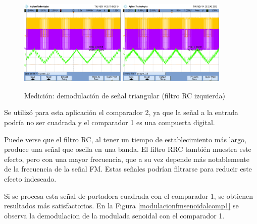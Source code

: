 \begin{figure}[H]
    \centering
    \includegraphics[width=0.45\textwidth]{../Ex2/resources/demodulacionfmtrirc.png}
    \includegraphics[width=0.45\textwidth]{../Ex2/resources/demodulacionfmtrirrc.png}
    \caption{Medición: demodulación de señal triangular (filtro RC izquierda)}
    \label{demodulacionfmtri}
\end{figure}
Se utilizó para esta aplicación el comparador 2, ya que la señal a la entrada podría no ser cuadrada y el comparador 1 es una compuerta digital.

Puede verse que el filtro RC, al tener un tiempo de establecimiento más largo, produce una señal que oscila en una banda. El filtro RRC también muestra este efecto, pero con una mayor frecuencia, que a su vez depende más notablemente de la frecuencia de la señal FM. Estas señales podrían filtrarse para reducir este efecto indeseado.

Si se procesa esta señal de portadora cuadrada con el comparador 1, se obtienen resultados más satisfactorios. En la Figura \ref{modulacionfmsenoidalcomp1} se observa la demodulacion de la modulada senoidal con el comparador 1.

